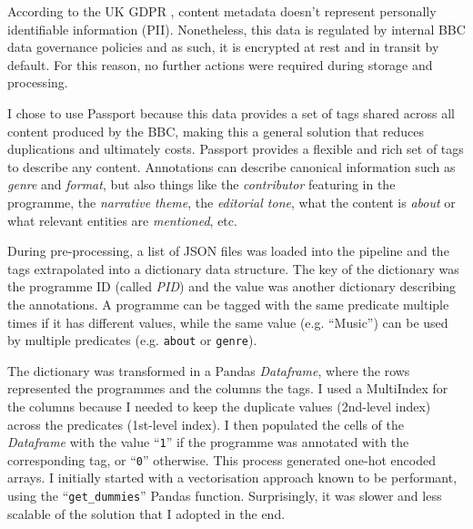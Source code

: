 
According to the UK GDPR \cite{UKGDPR}, content metadata doesn't represent personally identifiable information (PII). Nonetheless,
this data is regulated by internal BBC data governance policies and as such, it is encrypted at rest and in transit by default.
For this reason, no further actions were required during storage and processing.


I chose to use Passport because this data provides a set of tags shared across all content produced by the BBC,
making this a general solution that reduces duplications and ultimately costs. Passport provides a flexible and rich set of tags to describe
any content. Annotations can describe canonical information such as \textit{genre} and \textit{format}, but also things like the \textit{contributor}
featuring in the programme, the \textit{narrative theme}, the \textit{editorial tone}, what the content is \textit{about}
or what relevant entities are \textit{mentioned}, etc.


During pre-processing, a list of JSON files was loaded into the pipeline and the tags extrapolated into a dictionary data structure.
The key of the dictionary was the programme ID (called \textit{PID}) and the value was another dictionary describing the annotations.
A programme can be tagged with the same predicate multiple times if it has different values,
while the same value (e.g. ``Music'') can be used by multiple predicates (e.g. \verb|about| or \verb|genre|).

The dictionary was transformed in a Pandas \textit{Dataframe}, where the rows represented the programmes and the columns the tags.
I used a MultiIndex \cite{Pandas:MultiIndex} for the columns because I needed to keep the duplicate values (2nd-level index) across the predicates
(1st-level index).
I then populated the cells of the \textit{Dataframe} with the value ``\verb|1|'' if the programme was annotated with the corresponding tag,
or ``\verb|0|'' otherwise.
This process generated one-hot encoded arrays. I initially started with a vectorisation approach known to be performant,
using the ``\verb|get_dummies|'' Pandas function. Surprisingly, it was slower and less scalable of the solution that
I adopted in the end.

